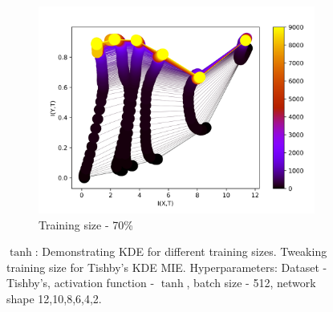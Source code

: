 \documentclass[dissertation.tex]{subfiles}
\begin{document}
\begin{figure}[ht]
\begin{subfigure}[t]{0.32\textwidth}
    \centering
    \includegraphics[width=\textwidth]{figs/eval/trainingSize/KDE70.png}
    \caption{
      Training size - 70\%
    }
    \label{figKDETS70}
  \end{subfigure}
  \caption{
      $\tanh$: Demonstrating KDE for different training sizes.  Tweaking training
      size for Tishby's KDE MIE. Hyperparameters: Dataset - Tishby's, activation
      function - $\tanh$, batch size - 512, network shape 12,10,8,6,4,2.
    }
  \label{figKDETS}
\end{figure}
\end{document}
